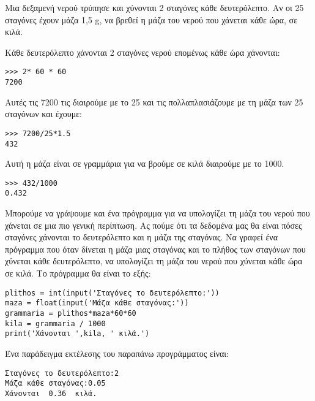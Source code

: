 \begin{exercise}
Μια δεξαμενή νερού τρύπησε και χύνονται 2 σταγόνες κάθε δευτερόλεπτο. Αν οι 25
σταγόνες έχουν μάζα 1,5 g, να βρεθεί η μάζα του νερού που χάνεται κάθε ώρα,
σε κιλά.
\end{exercise}
Κάθε δευτερόλεπτο χάνονται 2 σταγόνες νερού επομένως κάθε ώρα χάνονται:
\begin{lstlisting}
>>> 2* 60 * 60
7200
\end{lstlisting}
Αυτές τις 7200 τις διαιρούμε με το 25 και τις πολλαπλασιάζουμε με τη μάζα των 25 σταγόνων και έχουμε:
\begin{lstlisting}
>>> 7200/25*1.5
432
\end{lstlisting}
Αυτή η μάζα είναι σε γραμμάρια για να βρούμε σε κιλά διαιρούμε με το 1000.
\begin{lstlisting}
>>> 432/1000
0.432
\end{lstlisting}
Μπορούμε να γράψουμε και ένα πρόγραμμα για να υπολογίζει τη μάζα του νερού που χάνεται σε μια πιο γενική περίπτωση. Ας πούμε ότι τα δεδομένα μας θα είναι πόσες σταγόνες χάνονται το δευτερόλεπτο και η μάζα της σταγόνας. Να γραφεί ένα πρόγραμμα που όταν δίνεται η μάζα μιας σταγόνας και το πλήθος των σταγόνων που χύνεται κάθε δευτερόλεπτο, να υπολογίζει τη μάζα του νερού που χύνεται κάθε ώρα σε κιλά.
Το πρόγραμμα θα είναι το εξής:
\begin{lstlisting}
plithos = int(input('Σταγόνες το δευτερόλεπτο:'))
maza = float(input('Μάζα κάθε σταγόνας:'))
grammaria = plithos*maza*60*60
kila = grammaria / 1000
print('Χάνονται ',kila, ' κιλά.')
\end{lstlisting}
Ένα παράδειγμα εκτέλεσης του παραπάνω προγράμματος είναι:
\begin{lstlisting}
Σταγόνες το δευτερόλεπτο:2
Μάζα κάθε σταγόνας:0.05
Χάνονται  0.36  κιλά.
\end{lstlisting}